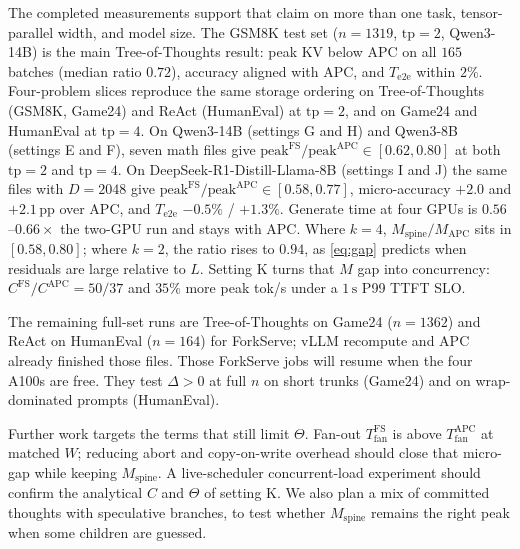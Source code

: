 \documentclass[11pt,a4paper]{article}
\begin{document}
The completed measurements support that claim on more than one task, tensor-parallel width, and model size.
The GSM8K test set ($n{=}1319$, $\mathrm{tp}{=}2$, Qwen3-14B) is the main Tree-of-Thoughts result: peak KV below APC on all $165$ batches (median ratio $0.72$), accuracy aligned with APC, and $T_{\mathrm{e2e}}$ within $2\%$.
Four-problem slices reproduce the same storage ordering on Tree-of-Thoughts (GSM8K, Game24) and ReAct (HumanEval) at $\mathrm{tp}{=}2$, and on Game24 and HumanEval at $\mathrm{tp}{=}4$.
On Qwen3-14B (settings G and H) and Qwen3-8B (settings E and F), seven math files give $\mathrm{peak}^{\mathrm{FS}}/\mathrm{peak}^{\mathrm{APC}}\in[0.62,0.80]$ at both $\mathrm{tp}{=}2$ and $\mathrm{tp}{=}4$.
On DeepSeek-R1-Distill-Llama-8B (settings I and J) the same files with $D{=}2048$ give $\mathrm{peak}^{\mathrm{FS}}/\mathrm{peak}^{\mathrm{APC}}\in[0.58,0.77]$, micro-accuracy $+2.0$ and $+2.1$\,pp over APC, and $T_{\mathrm{e2e}}$ $-0.5\%$ / $+1.3\%$.
Generate time at four GPUs is $0.56$--$0.66\times$ the two-GPU run and stays with APC.
Where $k{=}4$, $M_{\mathrm{spine}}/M_{\mathrm{APC}}$ sits in $[0.58,0.80]$; where $k{=}2$, the ratio rises to $0.94$, as \eqref{eq:gap} predicts when residuals are large relative to $L$.
Setting K turns that $M$ gap into concurrency: $C^{\mathrm{FS}}/C^{\mathrm{APC}}{=}50/37$ and $35\%$ more peak tok/s under a $1\,\mathrm{s}$ P99 TTFT SLO.

The remaining full-set runs are Tree-of-Thoughts on Game24 ($n{=}1362$) and ReAct on HumanEval ($n{=}164$) for ForkServe; vLLM recompute and APC already finished those files.
Those ForkServe jobs will resume when the four A100s are free.
They test $\Delta>0$ at full $n$ on short trunks (Game24) and on wrap-dominated prompts (HumanEval).

Further work targets the terms that still limit $\Theta$.
Fan-out $T_{\mathrm{fan}}^{\mathrm{FS}}$ is above $T_{\mathrm{fan}}^{\mathrm{APC}}$ at matched $W$; reducing abort and copy-on-write overhead should close that micro-gap while keeping $M_{\mathrm{spine}}$.
A live-scheduler concurrent-load experiment should confirm the analytical $C$ and $\Theta$ of setting K.
We also plan a mix of committed thoughts with speculative branches, to test whether $M_{\mathrm{spine}}$ remains the right peak when some children are guessed.
\end{document}
